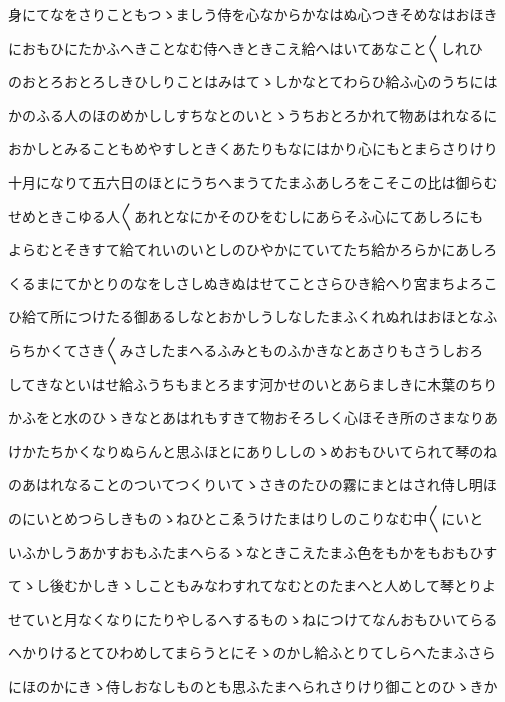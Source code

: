 \documentclass[a4paper,11pt,landscape]{ltjtarticle}
\begin{document}
\par\medskip
身にてなをさりこともつゝましう侍を心なからかなはぬ心つきそめなはおほき
\par\medskip
におもひにたかふへきことなむ侍へきときこえ給へはいてあなこと〱しれひ
\par\medskip
のおとろおとろしきひしりことはみはてゝしかなとてわらひ給ふ心のうちには
\par\medskip
かのふる人のほのめかししすちなとのいとゝうちおとろかれて物あはれなるに
\par\medskip
おかしとみることもめやすしときくあたりもなにはかり心にもとまらさりけり
\par\medskip
十月になりて五六日のほとにうちへまうてたまふあしろをこそこの比は御らむ
\par\medskip
せめときこゆる人〱あれとなにかそのひをむしにあらそふ心にてあしろにも
\par\medskip
よらむとそきすて給てれいのいとしのひやかにていてたち給かろらかにあしろ
\par\medskip
くるまにてかとりのなをしさしぬきぬはせてことさらひき給へり宮まちよろこ
\par\medskip
ひ給て所につけたる御あるしなとおかしうしなしたまふくれぬれはおほとなふ
\par\medskip
らちかくてさき〱みさしたまへるふみとものふかきなとあさりもさうしおろ
\par\medskip
してきなといはせ給ふうちもまとろます河かせのいとあらましきに木葉のちり
\par\medskip
かふをと水のひゝきなとあはれもすきて物おそろしく心ほそき所のさまなりあ
\par\medskip
けかたちかくなりぬらんと思ふほとにありししのゝめおもひいてられて琴のね
\par\medskip
のあはれなることのついてつくりいてゝさきのたひの霧にまとはされ侍し明ほ
\par\medskip
のにいとめつらしきものゝねひとこゑうけたまはりしのこりなむ中〱にいと
\par\medskip
いふかしうあかすおもふたまへらるゝなときこえたまふ色をもかをもおもひす
\par\medskip
てゝし後むかしきゝしこともみなわすれてなむとのたまへと人めして琴とりよ
\par\medskip
せていと月なくなりにたりやしるへするものゝねにつけてなんおもひいてらる
\par\medskip
へかりけるとてひわめしてまらうとにそゝのかし給ふとりてしらへたまふさら
\par\medskip
にほのかにきゝ侍しおなしものとも思ふたまへられさりけり御ことのひゝきか
\par\medskip
\end{document}
